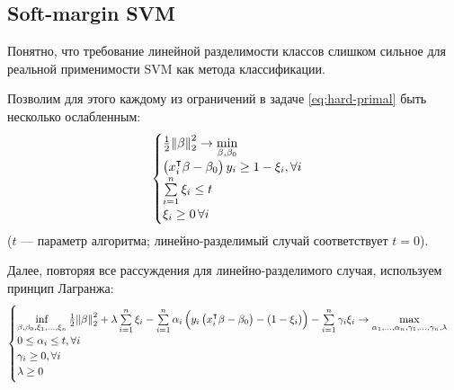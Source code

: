 \documentclass[11pt, a4paper]{article}\usepackage[]{graphicx}\usepackage[]{color}
\begin{document}
\subsection{Soft-margin SVM\label{sec:sm}}
Понятно, что требование линейной разделимости классов слишком сильное для реальной применимости SVM как метода классификации.

Позволим для этого каждому из ограничений в задаче \eqref{eq:hard-primal} быть несколько ослабленным:
\begin{equation}
\begin{cases}
\frac{1}{2}\norm{\beta}^2_2\rightarrow \min\limits_{\beta, \beta_0} \\
\left(x_i^\intercal \beta - \beta_0\right) y_i \geq 1 - \xi_i, \forall i\\
\sum\limits_{i=1}^{n}\xi_i \leq t \\
\xi_i\geq 0\, \forall i \\
\end{cases}
\label{eq:soft-primal}
\end{equation}
($t$ --- параметр алгоритма; линейно-разделимый случай соответствует $t=0$).

Далее, повторяя все рассуждения для линейно-разделимого случая, используем принцип Лагранжа:
\begin{equation}
\begin{cases}
\inf\limits_{\beta,\beta_0,\xi_1,\dots,\xi_n} \frac{1}{2}\norm{\beta}_2^2+\lambda\sum\limits_{i=1}^{n}\xi_i-\sum\limits_{i=1}^n{\alpha_i\left(y_i\left(x_i^\intercal \beta - \beta_0\right) - \left(1-\xi_i\right)\right)}-\sum\limits_{i=1}^n\gamma_i\xi_i \rightarrow \max\limits_{\alpha_1,\dots,\alpha_n, \gamma_1,\dots,\gamma_n,\lambda} \\
0 \leq \alpha_i \leq t, \forall i \\
\gamma_i \geq 0, \forall i \\
\lambda \geq 0 \\
\end{cases}
\label{eq:soft-dual}
\end{equation}
\end{document}
